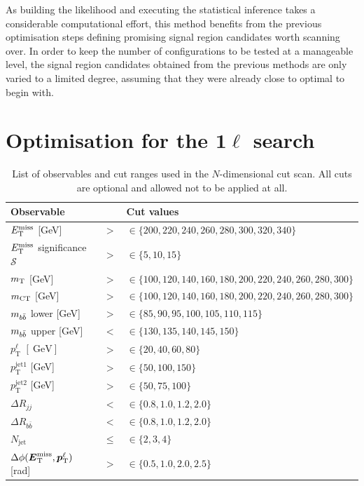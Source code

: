 As building the likelihood and executing the statistical inference takes a considerable computational effort, this method benefits from the previous optimisation steps defining promising signal region candidates worth scanning over.
In order to keep the number of configurations to be tested at a manageable level, the signal region candidates obtained from the previous methods are only varied to a limited degree, assuming that they were already close to optimal to begin with.

\section[Optimisation for the $1\ell$ search]{Optimisation for the $\boldsymbol{1\ell}$ search}

\begin{table}
	\centering
	\small
	\setlength\heavyrulewidth{0.2ex}
	\caption{List of observables and cut ranges used in the $N$-dimensional cut scan. All cuts are optional and allowed not to be applied at all.}
	\begin{tabular} {l c l}
		\toprule
		Observable &  & Cut values \\ 
		\midrule
		$E_{\textrm{T}}^{\textrm{miss}}$ [GeV]& $>$ & $\in \{200,220,240,260,280,300,320,340\}$ \\
		$E_{\textrm{T}}^{\textrm{miss}}$ significance $\mathcal{S}$ & $>$ & $\in \{5,10,15\}$ \\
		$m_{\textrm{T}}$ [GeV]& $>$ & $\in \{100, 120, 140,160,180,200,220,240,260,280, 300\}$ \\
		$m_{\textrm{CT}}$ [GeV]& $>$ & $\in \{100, 120, 140,160,180,200,220,240,260,280, 300\}$ \\
		$m_{b\bar{b}}$ lower [GeV]& $>$ & $\in \{85,90,95,100,105,110,115\}$ \\
		$m_{b\bar{b}}$ upper [GeV]& $<$ & $\in \{130,135,140,145,150\}$ \\
		$p_\textrm{T}^\ell$ $[\SI{}{\GeV}]$& $>$ & $\in \{20, 40, 60, 80\}$ \\
		$p_\textrm{T}^\mathrm{jet1}$ [GeV]& $>$ & $\in \{50, 100, 150\}$ \\
		$p_\textrm{T}^\mathrm{jet2}$ [GeV]& $>$ & $\in \{50, 75, 100\}$ \\	
		$\Delta R_{jj}$ & $<$ & $\in \{0.8,1.0,1.2,2.0\}$ \\
		$\Delta R_{b\bar{b}}$ & $<$ & $\in \{0.8,1.0,1.2,2.0\}$ \\
		$N_\mathrm{jet}$ & $\leq$ & $\in \{2,3,4\}$ \\			
		$\Delta\phi (\boldsymbol{E}_{\textrm{T}}^{\textrm{miss}},\boldsymbol{p}_{\textrm{T}}^\ell )$ [rad]& $>$ & $\in \{0.5,1.0,2.0,2.5\}$ \\
		\bottomrule					
	\end{tabular}
	\label{tab:cut_scan}   
\end{table}

